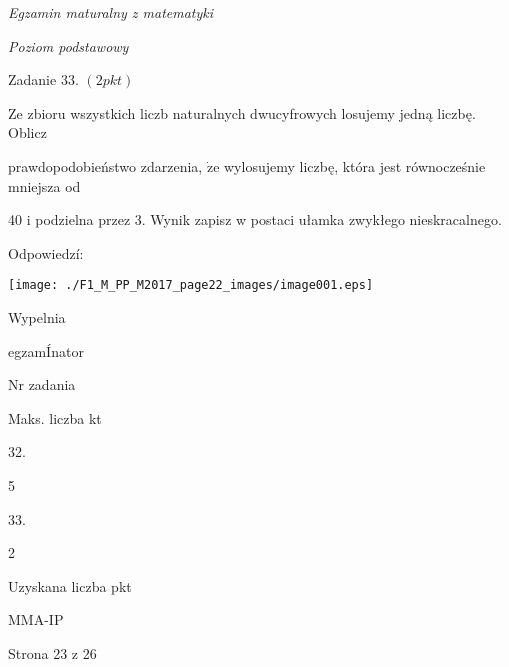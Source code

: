 \documentclass[a4paper,12pt]{article}
\begin{document}
{\it Egzamin maturalny z matematyki}

{\it Poziom podstawowy}

Zadanie 33. $(2pkt)$

Ze zbioru wszystkich liczb naturalnych dwucyfrowych losujemy jedną liczbę. Oblicz

prawdopodobieństwo zdarzenia, $\dot{\mathrm{z}}\mathrm{e}$ wylosujemy liczbę, która jest równocześnie mniejsza od

40 i podzielna przez 3. Wynik zapisz w postaci ułamka zwykłego nieskracalnego.

Odpowiedzí:
\begin{center}
\texttt{[image: ./F1\_M\_PP\_M2017\_page22\_images/image001.eps]}
\end{center}
Wypelnia

egzamÍnator

Nr zadania

Maks. liczba kt

32.

5

33.

2

Uzyskana liczba pkt

MMA-IP

Strona 23 z 26
\end{document}
